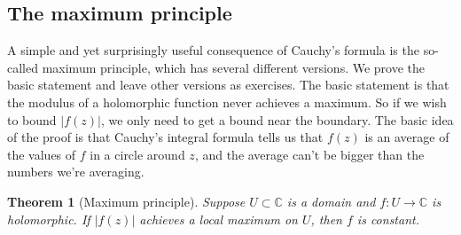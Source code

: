 \documentclass[12pt,openany]{book}
\newcommand{\sabs}[1]{\lvert {#1} \rvert}
\newcommand{\C}{{\mathbb{C}}}
\theoremstyle{plain}
\newtheorem{thm}{Theorem}[section]
\theoremstyle{remark}
\theoremstyle{definition}
\theoremstyle{exercise}
\theoremstyle{example}
\begin{document}
\subsection{The maximum principle}

A simple and yet surprisingly useful consequence of Cauchy's formula is the
so-called maximum principle, which has several different versions.
We prove the basic statement and leave other versions as exercises.
The basic statement is that the modulus of a holomorphic function never
achieves a maximum.  So if we wish to bound $\sabs{f(z)}$, we only need to
get a bound near the boundary.
The basic idea of the proof is that Cauchy's integral formula tells us that
$f(z)$ is an average of the values of $f$ in a circle around $z$, and the
average can't be bigger than the numbers we're averaging.

\begin{thm}[Maximum principle]
%
Suppose $U \subset \C$ is a domain and
$f \colon U \to \C$ is holomorphic.
If $\sabs{f(z)}$ achieves a local maximum on $U$, then $f$ is constant.
\end{thm}
\end{document}
